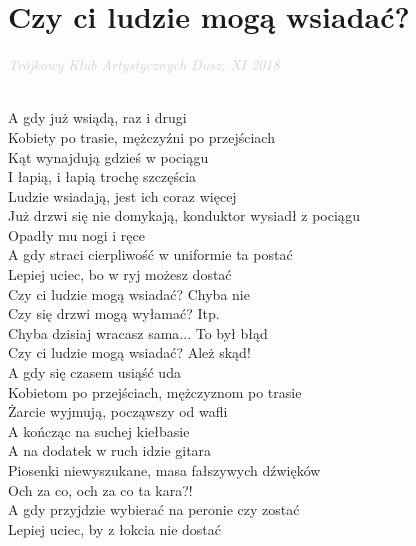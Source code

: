 \documentclass[a5paper, 10pt]{book}
\begin{document}
\newpage
\section{Czy ci ludzie mogą wsiadać?}\textcolor{lightgray}{\textit{Trójkowy Klub Artystycznych Dusz, XI 2018}}\\~\\
\begin{minipage}[t]{0.8\textwidth}
A gdy już wsiądą, raz i drugi \\
Kobiety po trasie, mężczyźni po przejściach \\
Kąt wynajdują gdzieś w pociągu \\
I łapią, i łapią trochę szczęścia \vspace*{1.5mm}\\
\hspace*{4mm}Ludzie wsiadają, jest ich coraz więcej \\
\hspace*{4mm}Już drzwi się nie domykają, konduktor wysiadł z pociągu \\
\hspace*{4mm}Opadły mu nogi i ręce\\
\hspace*{4mm}A gdy straci cierpliwość w uniformie ta postać \\
\hspace*{4mm}Lepiej uciec, bo w ryj możesz dostać \\

\hspace*{7mm}Czy ci ludzie mogą wsiadać? Chyba nie \\
\hspace*{7mm}Czy się drzwi mogą wyłamać? Itp. \\
\hspace*{7mm}Chyba dzisiaj wracasz sama... To był błąd \\
\hspace*{7mm}Czy ci ludzie mogą wsiadać? Ależ skąd! \\

A gdy się czasem usiąść uda\\
Kobietom po przejściach, mężczyznom po trasie\\
Żarcie wyjmują, począwszy od wafli\\
A kończąc na suchej kiełbasie\vspace*{1.5mm}\\
\hspace*{4mm}A na dodatek w ruch idzie gitara\\
\hspace*{4mm}Piosenki niewyszukane, masa fałszywych dźwięków\\
\hspace*{4mm}Och za co, och za co ta kara?!\\
\hspace*{4mm}A gdy przyjdzie wybierać na peronie czy zostać\\
\hspace*{4mm}Lepiej uciec, by z łokcia nie dostać\\


\end{minipage}
\end{document}
